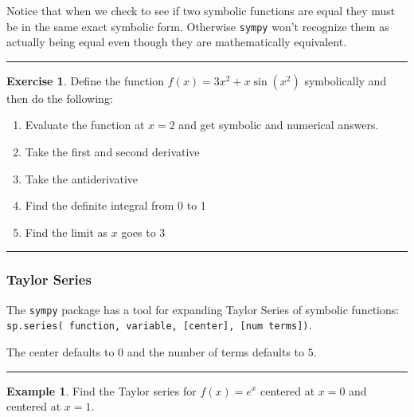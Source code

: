 \documentclass[
]{book}
\providecommand{\tightlist}{%
  \setlength{\itemsep}{0pt}\setlength{\parskip}{0pt}}
\theoremstyle{definition}
\theoremstyle{definition}
\newtheorem{example}{Example}[chapter]
\theoremstyle{definition}
\newtheorem{exercise}{Exercise}[chapter]
\theoremstyle{remark}
\begin{document}
Notice that when we check to see if two symbolic functions are equal they must be in the same exact symbolic form. Otherwise \texttt{sympy} won't recognize them as actually being equal even though they are mathematically equivalent.

\begin{center}\rule{0.5\linewidth}{0.5pt}\end{center}

\begin{exercise}
\protect\hypertarget{exr:unnamed-chunk-814}{}{\label{exr:unnamed-chunk-814} }Define the function \(f(x) = 3x^2 + x\sin(x^2)\) symbolically and then do the following:

\begin{enumerate}
\def\labelenumi{\alph{enumi}.}
\tightlist
\item
  Evaluate the function at \(x=2\) and get symbolic and numerical answers.
\item
  Take the first and second derivative
\item
  Take the antiderivative
\item
  Find the definite integral from 0 to 1
\item
  Find the limit as \(x\) goes to 3
\end{enumerate}
\end{exercise}

\begin{center}\rule{0.5\linewidth}{0.5pt}\end{center}

\hypertarget{taylor-series}{%
\subsubsection{Taylor Series}\label{taylor-series}}

The \texttt{sympy} package has a tool for expanding Taylor Series of symbolic functions: \texttt{sp.series(\ function,\ variable,\ {[}center{]},\ {[}num\ terms{]})}.

The center defaults to \(0\) and the number of terms defaults to \(5\).

\begin{center}\rule{0.5\linewidth}{0.5pt}\end{center}

\begin{example}
\protect\hypertarget{exm:unnamed-chunk-815}{}{\label{exm:unnamed-chunk-815} }Find the Taylor series for \(f(x) = e^x\) centered at \(x=0\) and centered at \(x=1\).
\end{example}
\end{document}
